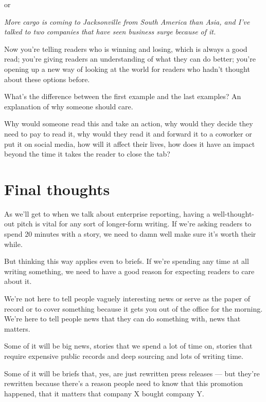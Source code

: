 \documentclass[
  11pt,
  american,
  letterpaperpaper,
  extrafontsizes,onecolumn,openright
  ]{memoir}
\begin{document}
or

\emph{More cargo is coming to Jacksonville from South America than Asia, and I've talked to two companies that have seen business surge because of it.}

Now you're telling readers who is winning and losing, which is always a good read; you're giving readers an understanding of what they can do better; you're opening up a new way of looking at the world for readers who hadn't thought about these options before.

What's the difference between the first example and the last examples? An explanation of why someone should care.

Why would someone read this and take an action, why would they decide they need to pay to read it, why would they read it and forward it to a coworker or put it on social media, how will it affect their lives, how does it have an impact beyond the time it takes the reader to close the tab?

\hypertarget{final-thoughts-3}{%
\section*{Final thoughts}\label{final-thoughts-3}}

As we'll get to when we talk about enterprise reporting, having a well-thought-out pitch is vital for any sort of longer-form writing. If we're asking readers to spend 20 minutes with a story, we need to damn well make sure it's worth their while.

But thinking this way applies even to briefs. If we're spending any time at all writing something, we need to have a good reason for expecting readers to care about it.

We're not here to tell people vaguely interesting news or serve as the paper of record or to cover something because it gets you out of the office for the morning. We're here to tell people news that they can do something with, news that matters.

Some of it will be big news, stories that we spend a lot of time on, stories that require expensive public records and deep sourcing and lots of writing time.

Some of it will be briefs that, yes, are just rewritten press releases --- but they're rewritten because there's a reason people need to know that this promotion happened, that it matters that company X bought company Y.
\end{document}
